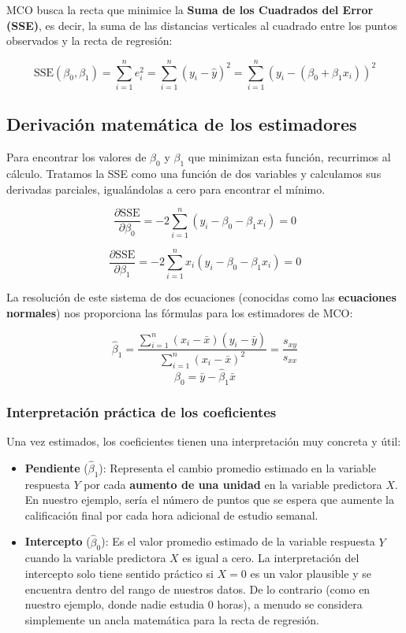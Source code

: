 \documentclass[
  letterpaper,
  DIV=11,
  numbers=noendperiod]{scrreprt}
\begin{document}
MCO busca la recta que minimice la \textbf{Suma de los Cuadrados del
Error (SSE)}, es decir, la suma de las distancias verticales al cuadrado
entre los puntos observados y la recta de regresión:

\[
\text{SSE}(\beta_0, \beta_1) = \sum_{i=1}^{n} e_i^2 = \sum_{i=1}^{n} (y_i-\hat{y})^2 = \sum_{i=1}^{n} (y_i - (\beta_0 + \beta_1 x_i))^2
\]

\subsection{Derivación matemática de los
estimadores}\label{derivaciuxf3n-matemuxe1tica-de-los-estimadores}

Para encontrar los valores de \(\beta_0\) y \(\beta_1\) que minimizan
esta función, recurrimos al cálculo. Tratamos la SSE como una función de
dos variables y calculamos sus derivadas parciales, igualándolas a cero
para encontrar el mínimo.

\[
\frac{\partial \text{SSE}}{\partial \beta_0} = -2 \sum_{i=1}^{n} (y_i - \beta_0 - \beta_1 x_i) = 0
\]

\[
\frac{\partial \text{SSE}}{\partial \beta_1} = -2 \sum_{i=1}^{n} x_i (y_i - \beta_0 - \beta_1 x_i) = 0
\]

La resolución de este sistema de dos ecuaciones (conocidas como las
\textbf{ecuaciones normales}) nos proporciona las fórmulas para los
estimadores de MCO:

\[
\hat{\beta}_1 = \frac{\sum_{i=1}^{n}(x_i - \bar{x})(y_i - \bar{y})}{\sum_{i=1}^{n}(x_i - \bar{x})^2} = \frac{s_{xy}}{s_{xx}}
\] \[ \hat{\beta}_0 = \bar{y} - \hat{\beta}_1 \bar{x}
\]

\subsubsection{Interpretación práctica de los
coeficientes}\label{interpretaciuxf3n-pruxe1ctica-de-los-coeficientes}

Una vez estimados, los coeficientes tienen una interpretación muy
concreta y útil:

\begin{itemize}
\item
  \textbf{Pendiente} (\(\hat{\beta}_1\)): Representa el cambio promedio
  estimado en la variable respuesta \(Y\) por cada \textbf{aumento de
  una unidad} en la variable predictora \(X\). En nuestro ejemplo, sería
  el número de puntos que se espera que aumente la calificación final
  por cada hora adicional de estudio semanal.
\item
  \textbf{Intercepto} (\(\hat{\beta}_0\)): Es el valor promedio estimado
  de la variable respuesta \(Y\) cuando la variable predictora \(X\) es
  igual a cero. La interpretación del intercepto solo tiene sentido
  práctico si \(X=0\) es un valor plausible y se encuentra dentro del
  rango de nuestros datos. De lo contrario (como en nuestro ejemplo,
  donde nadie estudia 0 horas), a menudo se considera simplemente un
  ancla matemática para la recta de regresión.
\end{itemize}
\end{document}

